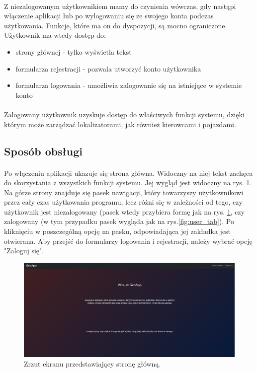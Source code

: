 \paragraph{}
Z niezalogowanym użytkownikiem mamy do czynienia wówczas, gdy nastąpi włączenie aplikacji lub po wylogowaniu się ze swojego konta podczas użytkowania. Funkcje, które ma on do dyspozycji, są mocno ograniczone. Użytkownik ma wtedy dostęp do:
\begin{itemize}
	\item strony głównej - tylko wyświetla tekst 
	\item formularza rejestracji - pozwala utworzyć konto użytkownika
	\item formularza logowania - umożliwia zalogowanie się na istniejące w systemie konto
\end{itemize}

\paragraph{}
Zalogowany użytkownik uzyskuje dostęp do właściwych funkcji systemu, dzięki którym może zarządzać lokalizatorami, jak również kierowcami i pojazdami.

\subsection{Sposób obsługi}
\paragraph{}
Po włączeniu aplikacji ukazuje się strona główna. Widoczny na niej tekst zachęca do skorzystania z wszystkich funkcji systemu. Jej wygląd jest widoczny na rys. \ref{fig:home_page}. Na górze strony znajduje się pasek nawigacji, który towarzyszy użytkownikowi przez cały czas użytkowania programu, lecz różni się w zależności od tego, czy użytkownik jest niezalogowany (pasek wtedy przybiera formę jak na rys. \ref{fig:home_page}, czy zalogowany (w tym przypadku pasek wygląda jak na rys.\ref{fig:user_tab}). Po kliknięciu w poszczególną opcję na pasku, odpowiadająca jej zakładka jest otwierana. Aby przejść do formularzy logowania i rejestracji, należy wybrać opcję "Zaloguj się".

\begin{figure}
	\centering
	\includegraphics[width=1\textwidth]{./graf/home_page.png}
	\caption{Zrzut ekranu przedstawiający stronę główną.}
	\label{fig:home_page}
\end{figure}

